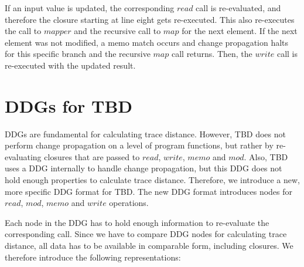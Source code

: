 If an input value is updated, the corresponding $read$ call is re-evaluated, and therefore the closure starting at line eight gets re-executed. This also re-executes the call to $mapper$ and the recursive call to $map$ for the next element. If the next element was not modified, a memo match occurs and change propagation halts for this specific branch and the recursive $map$ call returns. Then, the $write$ call is re-executed with the updated result. 

\chapter{DDGs for TBD}
\label{sec:tbd_ddgs}

DDGs are fundamental for calculating trace distance. However, TBD does not perform change propagation on a level of program functions, but rather by re-evaluating closures that are passed to $read$, $write$, $memo$ and $mod$. Also, TBD uses a DDG internally to handle change propagation, but this DDG does not hold enough properties to calculate trace distance. Therefore, we introduce a new, more specific DDG format for TBD. The new DDG format introduces nodes for $read$, $mod$, $memo$ and $write$ operations. 

Each node in the DDG has to hold enough information to re-evaluate the corresponding call. Since we have to compare DDG nodes for calculating trace distance, all data has to be available in comparable form, including closures. We therefore introduce the following representations: 

